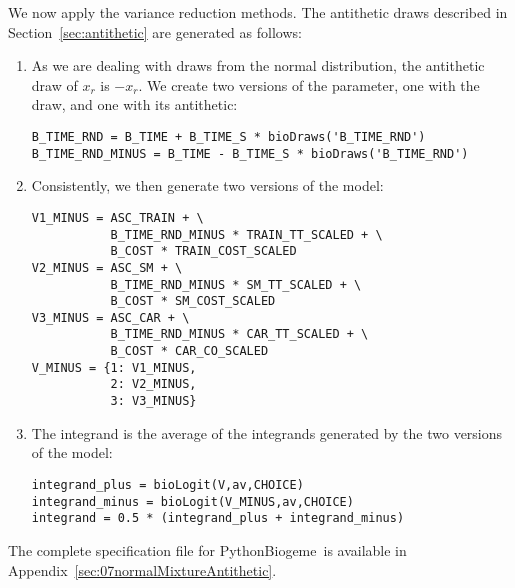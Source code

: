 \documentclass[12pt,a4paper]{article}
\newcommand{\PBIOGEME}{PythonBiogeme}
\begin{document}
We now apply the variance reduction methods. The antithetic draws
described in Section~\ref{sec:antithetic} are generated as follows:
\begin{enumerate}
\item As we are dealing with draws from the normal distribution, the
  antithetic draw of  $x_r$ is $-x_r$. We create two versions of the
  parameter, one with the draw, and one with its antithetic: 
\begin{lstlisting}
B_TIME_RND = B_TIME + B_TIME_S * bioDraws('B_TIME_RND')
B_TIME_RND_MINUS = B_TIME - B_TIME_S * bioDraws('B_TIME_RND')
\end{lstlisting}
\item Consistently, we then generate two versions of the model:
\begin{lstlisting}
V1_MINUS = ASC_TRAIN + \
           B_TIME_RND_MINUS * TRAIN_TT_SCALED + \
           B_COST * TRAIN_COST_SCALED
V2_MINUS = ASC_SM + \
           B_TIME_RND_MINUS * SM_TT_SCALED + \
           B_COST * SM_COST_SCALED
V3_MINUS = ASC_CAR + \
           B_TIME_RND_MINUS * CAR_TT_SCALED + \
           B_COST * CAR_CO_SCALED
V_MINUS = {1: V1_MINUS,
           2: V2_MINUS,
           3: V3_MINUS}
\end{lstlisting}
\item The integrand is the average of the integrands
  generated by the two versions of the model:
\begin{lstlisting}
integrand_plus = bioLogit(V,av,CHOICE)
integrand_minus = bioLogit(V_MINUS,av,CHOICE)
integrand = 0.5 * (integrand_plus + integrand_minus)
\end{lstlisting}
\end{enumerate}
The complete specification file for \PBIOGEME\ is available in
Appendix~\ref{sec:07normalMixtureAntithetic}.
\end{document}
